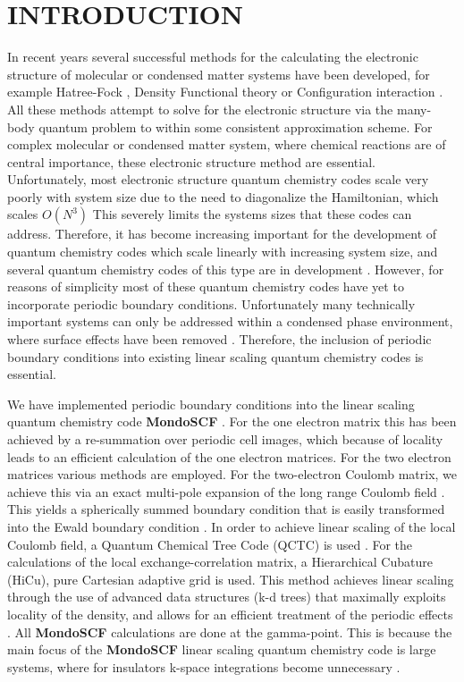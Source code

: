 \documentclass[prb,aps,nobibnotes,twocolumn,doublespace,twocolumngrid,superbib]{revtex4}
\begin{document}
\section{INTRODUCTION}
In recent years several successful methods for the calculating the electronic structure of
molecular or condensed matter systems have been developed,
for example Hatree-Fock \cite{slater,CRoothaan51}, Density Functional theory 
\cite{hohen,KohnSham65} or Configuration interaction \cite{Choudhury79}. 
All these methods attempt to solve for the electronic structure via
the many-body quantum problem to within some consistent approximation scheme.
For complex molecular or condensed matter 
system, where chemical reactions are of central importance, these electronic structure
method are essential. Unfortunately, most electronic structure quantum chemistry codes
scale very poorly with system size due to the need to diagonalize the Hamiltonian,
which scales $O(N^3)$ 
%
%
This severely limits the systems sizes 
that these codes can address. Therefore, it has become increasing important for
the development of quantum chemistry codes which scale linearly with increasing 
system size, and several quantum chemistry codes of this type are in 
development 
\cite{Goedecker94,Challacombe96,Canning96,Briggs96,EHernandez96,Scuseria99,ANiklasson02B}. 
However, for reasons of simplicity most of these quantum 
chemistry codes have yet to incorporate periodic boundary conditions.
Unfortunately many
technically important systems can only be addressed within a condensed phase environment,
where surface effects have been removed \cite{Allen90}. Therefore, the inclusion of 
periodic boundary conditions into existing linear scaling quantum chemistry
codes is essential. 

We have implemented periodic boundary conditions into the linear scaling
quantum chemistry code \textbf{MondoSCF} 
\cite{Challacombe96,Challacombe97,Challacombe99}.
For the one electron matrix this has been achieved by a re-summation
over periodic cell images, which because of locality leads to an efficient
calculation of the one electron matrices. For the two electron matrices
various methods are employed. For the two-electron Coulomb matrix,
we achieve this via an exact multi-pole expansion of the long range
Coulomb field \cite{White94,Challacombe97b}. This yields a spherically
summed boundary condition that is easily transformed into the Ewald boundary
condition \cite{Redlack72,Redlack75}. In order to achieve linear
scaling of the local Coulomb field, a Quantum Chemical Tree Code (QCTC)
is used \cite{WarSal93,WarSal95,Salmon:93,Challacombe96A}. For the calculations of the 
local exchange-correlation matrix, a Hierarchical Cubature (HiCu), pure 
Cartesian adaptive grid
is used. This method achieves linear scaling through the use of advanced
data structures (k-d trees) that maximally exploits locality of the
density, and allows for an efficient treatment of the periodic effects
\cite{Bentley79}. All \textbf{MondoSCF} calculations are done at the gamma-point.
This is because the main focus of the \textbf{MondoSCF} linear scaling quantum chemistry
code is large systems, where for insulators k-space integrations become unnecessary 
\cite{Nunes94}.
\end{document}
